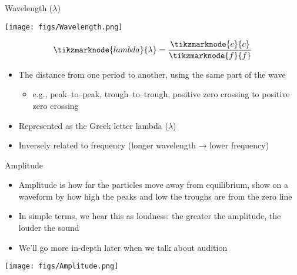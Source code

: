 \documentclass[professionalfonts]{beamer}
\begin{document}
\begin{frame}{Wavelength ($\lambda$)}
    \begin{multicols}{2}
        \begin{center}
            \texttt{[image: figs/Wavelength.png]}
        \end{center}
        \vspace{3em}
        \begin{equation*}
            \tikzmarknode{lambda}{\lambda} = \frac{\tikzmarknode{c}{c}}{\tikzmarknode{f}{f}}
        \end{equation*}
        \columnbreak
        \begin{itemize}
            \item The distance from one period to another, using the same part of the wave
            \begin{itemize}
                \item e.g., peak–to–peak, trough–to–trough, positive zero crossing to positive zero crossing
            \end{itemize}
            \item Represented as the Greek letter lambda ($\lambda$)
            \item Inversely related to frequency (longer wavelength → lower frequency)
        \end{itemize}
    \end{multicols}
\end{frame}

\begin{frame}{Amplitude}
    \begin{multicols}{2}
        \begin{itemize}
            \item Amplitude is how far the particles move away from equilibrium, show on a waveform by how high the peaks and low the troughs are from the zero line
            \item In simple terms, we hear this as loudness: the greater the amplitude, the louder the sound
            \item We'll go more in-depth later when we talk about audition
        \end{itemize}
        \columnbreak
        \texttt{[image: figs/Amplitude.png]}
    \end{multicols}
\end{frame}
\end{document}
